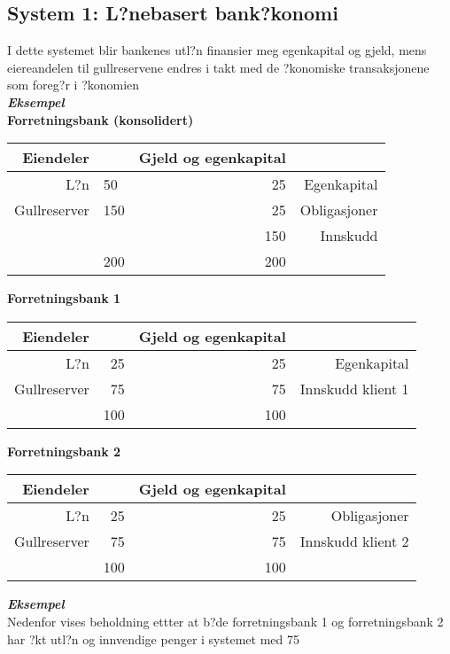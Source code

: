 \documentclass[a4paper,notitlepage]{article}
\begin{document}
\subsection{System 1: L?nebasert bank?konomi}
I dette systemet blir bankenes utl?n finansier meg egenkapital og gjeld, mens eiereandelen til gullreservene endres i takt med de ?konomiske transaksjonene som foreg?r i ?konomien  \\

\noindent\textbf{\emph{Eksempel}}\\
\textbf{Forretningsbank (konsolidert)}
\begin{center}\begin{tabular}{rlrr}
    \textbf{Eiendeler} & \textbf{} & \textbf{Gjeld og egenkapital} & \textbf{} \\
\hline    L?n   & 50    & 25    & Egenkapital \\
    Gullreserver  &  150   & 25    & Obligasjoner \\
          &       & 150   & Innskudd \\
\hline          & 200   & 200   &  \\
\end{tabular}%
\end{center}
\noindent \textbf{Forretningsbank 1}
\begin{center}
\begin{tabular}{rrrr}
    \textbf{Eiendeler} & \textbf{} & \textbf{Gjeld og egenkapital} & \textbf{} \\
\hline    L?n   & 25    & 25    & Egenkapital \\
    Gullreserver & 75    & 75    & Innskudd klient 1 \\
\hline          & 100    & 100    &  \\
\end{tabular}%
\end{center}
\noindent \textbf{Forretningsbank 2}
\begin{center}

\begin{tabular}{rrrr}
    \textbf{Eiendeler} & \textbf{} & \textbf{Gjeld og egenkapital} & \textbf{} \\
\hline    L?n   & 25    & 25    & Obligasjoner \\
    Gullreserver & 75    & 75    & Innskudd klient 2 \\
\hline          & 100    & 100    &  \\
\end{tabular}%
\end{center}
\noindent\textbf{\emph{Eksempel}}\\
Nedenfor vises beholdning ettter at b?de forretningsbank 1 og forretningsbank 2 har ?kt utl?n og innvendige penger i systemet med 75 \\
\end{document}
